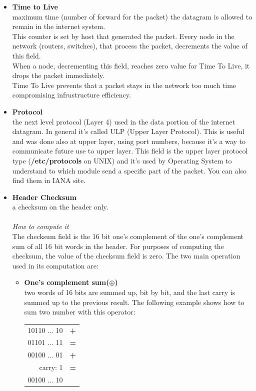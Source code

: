 \begin{itemize}
{The fragment offset is measured in units of 8 octets (64 bits).  The first fragment has offset zero.\\ It's computed starting from initial position in the packet.
}
\item{\textbf{Time to Live}\\
maximum time (number of forward for the packet) the datagram is allowed to remain in the internet system.\\
This counter is set by host that generated the packet. Every node in the network (routers, switches), that process the packet, decrements the value of this field.\\
When a node, decrementing this field, reaches zero value for Time To Live, it drops the packet immediately.\\
Time To Live prevents that a packet stays in the network too much time compromising infrustructure efficiency.
}
\item{\textbf{Protocol}\\
the next level protocol (Layer 4) used in the data portion of the internet datagram. In general it's called ULP (Upper Layer Protocol). This is useful and was done also at upper layer, using port numbers, because it's a way to communicate future use to upper layer. This field is the upper layer protocol type (\textbf{/etc/protocols} on UNIX) and it's used by Operating System to understand to which module send a specific part of the packet. You can also find them in IANA site\cite{IANA_IP_protocol}.
}
\item{\textbf{Header Checksum}\\
a checksum on the header only.\\\\
\textit{How to compute it}\\
The checksum field is the 16 bit one's complement of the one's complement sum of all 16 bit words in the header.  For purposes of computing the checksum, the value of the checksum field is zero. The two main operation used in its computation are:
\begin{itemize}
\item{\textbf{One's complement sum(}$\oplus$\textbf{)}\\
two words of 16 bits are summed up, bit by bit, and the last carry is summed up to the previous result. The following example shows how to sum two number with this operator:
\begin{table}[h]
\centering\footnotesize
\begin{tabular}{rl}
{10110 ... 10} & {\textbf{+}}\\
{01101 ... 11} & {\textbf{=}}\\
\hline
{00100 ... 01} & {\textbf{+}}\\
{carry: 1} & {\textbf{=}}\\
\hline
{00100 ... 10} &\\
\end{tabular}
\end{table}
}


\end{itemize}}
\end{itemize}
